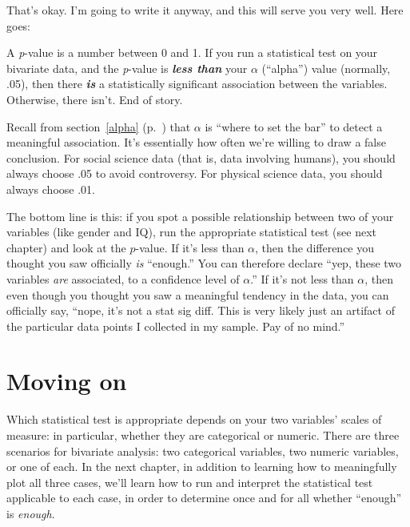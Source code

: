 That's okay. I'm going to write it anyway, and this will serve you very well. 
Here goes: 


\begin{shaded}
A \textit{p}-value is a number between 0 and 1. If you run a
statistical test on your bivariate data, and the \textit{p}-value is
\textbf{\textit{less than}} your $\alpha$ (``alpha'') value (normally, .05),
then there \textit{\textbf{is}} a statistically significant association between
the variables. Otherwise, there isn't. End of story.
\end{shaded}

Recall from section~\ref{alpha} (p.~\pageref{alpha}) that $\alpha$ is ``where
to set the bar'' to detect a meaningful association. It's essentially how often
we're willing to draw a false conclusion. For social science data (that is,
data involving humans), you should always choose .05 to avoid controversy. For
physical science data, you should always choose .01. 

The bottom line is this: if you spot a possible relationship between two of
your variables (like gender and IQ), run the appropriate statistical test (see
next chapter) and look at the $p$-value. If it's less than $\alpha$, then the
difference you thought you saw officially \textit{is} ``enough.'' You can
therefore declare ``yep, these two variables \textit{are} associated, to a
confidence level of $\alpha$.'' If it's not less than $\alpha$, then even
though you thought you saw a meaningful tendency in the data, you can
officially say, ``nope, it's not a stat sig diff. This is very likely just an
artifact of the particular data points I collected in my sample. Pay of no
mind.''

\section{Moving on}

Which statistical test is appropriate depends on your two variables' scales of
measure: in particular, whether they are categorical or numeric. There are
three scenarios for bivariate analysis: two categorical variables, two numeric
variables, or one of each. In the next chapter, in addition to learning how to
meaningfully plot all three cases, we'll learn how to run and interpret the
statistical test applicable to each case, in order to determine once and for
all whether ``enough'' is \textit{enough}.
